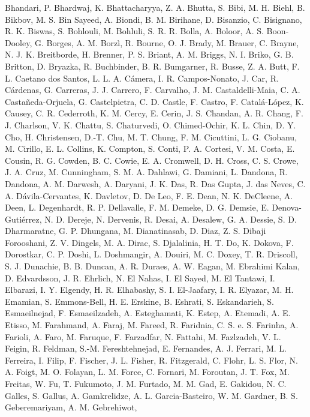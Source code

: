 \documentclass[
  letterpaper,
  DIV=11,
  numbers=noendperiod]{scrartcl}
\newlength{\cslhangindent}
\newenvironment{CSLReferences}[2] %
 {\begin{list}{}{%
  \setlength{\itemindent}{0pt}
  \setlength{\leftmargin}{0pt}
  \setlength{\parsep}{0pt}
  \ifodd #1
   \setlength{\leftmargin}{\cslhangindent}
   \setlength{\itemindent}{-1\cslhangindent}
  \fi
  \setlength{\itemsep}{#2\baselineskip}}}
 {\end{list}}
\begin{document}
\begin{CSLReferences}{0}{0}
{Bhandari, P. Bhardwaj, K. Bhattacharyya, Z. A. Bhutta, S. Bibi, M. H.
Biehl, B. Bikbov, M. S. Bin Sayeed, A. Biondi, B. M. Birihane, D.
Bisanzio, C. Bisignano, R. K. Biswas, S. Bohlouli, M. Bohluli, S. R. R.
Bolla, A. Boloor, A. S. Boon-Dooley, G. Borges, A. M. Borzì, R. Bourne,
O. J. Brady, M. Brauer, C. Brayne, N. J. K. Breitborde, H. Brenner, P.
S. Briant, A. M. Briggs, N. I. Briko, G. B. Britton, D. Bryazka, R.
Buchbinder, B. R. Bumgarner, R. Busse, Z. A. Butt, F. L. Caetano dos
Santos, L. L. A. Cámera, I. R. Campos-Nonato, J. Car, R. Cárdenas, G.
Carreras, J. J. Carrero, F. Carvalho, J. M. Castaldelli-Maia, C. A.
Castañeda-Orjuela, G. Castelpietra, C. D. Castle, F. Castro, F.
Catalá-López, K. Causey, C. R. Cederroth, K. M. Cercy, E. Cerin, J. S.
Chandan, A. R. Chang, F. J. Charlson, V. K. Chattu, S. Chaturvedi, O.
Chimed-Ochir, K. L. Chin, D. Y. Cho, H. Christensen, D.-T. Chu, M. T.
Chung, F. M. Cicuttini, L. G. Ciobanu, M. Cirillo, E. L. Collins, K.
Compton, S. Conti, P. A. Cortesi, V. M. Costa, E. Cousin, R. G. Cowden,
B. C. Cowie, E. A. Cromwell, D. H. Cross, C. S. Crowe, J. A. Cruz, M.
Cunningham, S. M. A. Dahlawi, G. Damiani, L. Dandona, R. Dandona, A. M.
Darwesh, A. Daryani, J. K. Das, R. Das Gupta, J. das Neves, C. A.
Dávila-Cervantes, K. Davletov, D. De Leo, F. E. Dean, N. K. DeCleene, A.
Deen, L. Degenhardt, R. P. Dellavalle, F. M. Demeke, D. G. Demsie, E.
Denova-Gutiérrez, N. D. Dereje, N. Dervenis, R. Desai, A. Desalew, G. A.
Dessie, S. D. Dharmaratne, G. P. Dhungana, M. Dianatinasab, D. Diaz, Z.
S. Dibaji Forooshani, Z. V. Dingels, M. A. Dirac, S. Djalalinia, H. T.
Do, K. Dokova, F. Dorostkar, C. P. Doshi, L. Doshmangir, A. Douiri, M.
C. Doxey, T. R. Driscoll, S. J. Dunachie, B. B. Duncan, A. R. Duraes, A.
W. Eagan, M. Ebrahimi Kalan, D. Edvardsson, J. R. Ehrlich, N. El Nahas,
I. El Sayed, M. El Tantawi, I. Elbarazi, I. Y. Elgendy, H. R. Elhabashy,
S. I. El-Jaafary, I. R. Elyazar, M. H. Emamian, S. Emmons-Bell, H. E.
Erskine, B. Eshrati, S. Eskandarieh, S. Esmaeilnejad, F. Esmaeilzadeh,
A. Esteghamati, K. Estep, A. Etemadi, A. E. Etisso, M. Farahmand, A.
Faraj, M. Fareed, R. Faridnia, C. S. e. S. Farinha, A. Farioli, A. Faro,
M. Faruque, F. Farzadfar, N. Fattahi, M. Fazlzadeh, V. L. Feigin, R.
Feldman, S.-M. Fereshtehnejad, E. Fernandes, A. J. Ferrari, M. L.
Ferreira, I. Filip, F. Fischer, J. L. Fisher, R. Fitzgerald, C. Flohr,
L. S. Flor, N. A. Foigt, M. O. Folayan, L. M. Force, C. Fornari, M.
Foroutan, J. T. Fox, M. Freitas, W. Fu, T. Fukumoto, J. M. Furtado, M.
M. Gad, E. Gakidou, N. C. Galles, S. Gallus, A. Gamkrelidze, A. L.
Garcia-Basteiro, W. M. Gardner, B. S. Geberemariyam, A. M. Gebrehiwot,
}
\end{CSLReferences}
\end{document}
